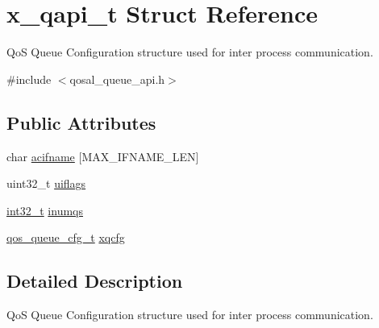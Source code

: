 \hypertarget{structx__qapi__t}{\section{x\-\_\-qapi\-\_\-t Struct Reference}
\label{structx__qapi__t}
}


Qo\-S Queue Configuration structure used for inter process communication.  




{\ttfamily \#include $<$qosal\-\_\-queue\-\_\-api.\-h$>$}

\subsection*{Public Attributes}
\begin{DoxyCompactItemize}
\item 
char \hyperlink{structx__qapi__t_a6671bab69f3b9d974fa7a1d84c8f5cde}{acifname} \mbox{[}M\-A\-X\-\_\-\-I\-F\-N\-A\-M\-E\-\_\-\-L\-E\-N\mbox{]}
\item 
uint32\-\_\-t \hyperlink{structx__qapi__t_af3b4909398080b7c1dfdce351624f288}{uiflags}
\item 
\hyperlink{commondefs_8h_a32f2e37ee053cf2ce8ca28d1f74630e5}{int32\-\_\-t} \hyperlink{structx__qapi__t_a88492f20f6606c17c7ef7818171e9868}{inumqs}
\item 
\hyperlink{group__FAPI__QOS__QUEUE_gaa27a8975bf3ed923f280f804086e1e4e}{qos\-\_\-queue\-\_\-cfg\-\_\-t} \hyperlink{structx__qapi__t_acb65b0589bf3cdcf72cbc6e320ddf9c6}{xqcfg}
\end{DoxyCompactItemize}


\subsection{Detailed Description}
Qo\-S Queue Configuration structure used for inter process communication. 


